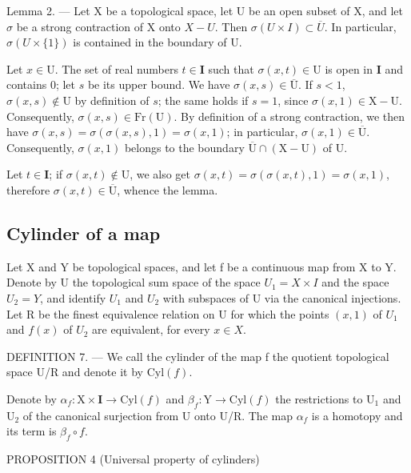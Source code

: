 Lemma 2. --- Let X be a topological space, let U be an open subset of X, and let \(\sigma\) be a strong contraction of X onto \(X-U\). Then \(\sigma(U\times I)\subset\overline{U}\). In particular, \(\sigma(U\times\{1\})\) is contained in the boundary of U.

Let \(x \in \mathrm{U}\). The set of real numbers \(t \in \mathbf{I}\) such that \(\sigma(x, t) \in \mathrm{U}\) is open in \(\mathbf{I}\) and contains 0; let \(s\) be its upper bound. We have \(\sigma(x, s) \in \overline{\mathrm{U}}\). If \(s < 1\), \(\sigma(x, s) \notin \mathrm{U}\) by definition of \(s\); the same holds if \(s = 1\), since \(\sigma(x, 1) \in \mathrm{X} - \mathrm{U}\). Consequently, \(\sigma(x, s) \in \mathrm{Fr}(\mathrm{U})\). By definition of a strong contraction, we then have \(\sigma(x, s) = \sigma(\sigma(x, s), 1) = \sigma(x, 1)\); in particular, \(\sigma(x, 1) \in \overline{\mathrm{U}}\). Consequently, \(\sigma(x, 1)\) belongs to the boundary \(\overline{\mathrm{U}} \cap (\mathrm{X} - \mathrm{U})\) of \(\mathrm{U}\).

Let \(t \in \mathbf{I}\); if \(\sigma(x,t) \notin \mathrm{U}\), we also get \(\sigma(x,t) = \sigma(\sigma(x,t),1) = \sigma(x,1)\), therefore \(\sigma(x,t) \in \overline{\mathrm{U}}\), whence the lemma.

\subsection{Cylinder of a map}

Let X and Y be topological spaces, and let f be a continuous map from X to Y. Denote by U the topological sum space of the space \(U_{1} = X \times I\) and the space \(U_{2} = Y\), and identify \(U_{1}\) and \(U_{2}\) with subspaces of U via the canonical injections. Let R be the finest equivalence relation on U for which the points \((x,1)\) of \(U_{1}\) and \(f(x)\) of \(U_{2}\) are equivalent, for every \(x \in X\).

DEFINITION 7. --- We call the cylinder of the map f the quotient topological space U/R and denote it by \(\mathrm{Cyl}(f)\).

Denote by \(\alpha_{f}\colon\mathrm{X}\times\mathbf{I}\to\mathrm{Cyl}(f)\) and \(\beta_{f}\colon\mathrm{Y}\to\mathrm{Cyl}(f)\) the restrictions to \(\mathrm{U}_{1}\) and \(\mathrm{U}_{2}\) of the canonical surjection from U onto U/R. The map \(\alpha_{f}\) is a homotopy and its term is \(\beta_{f}\circ f\).

PROPOSITION 4 (Universal property of cylinders)

